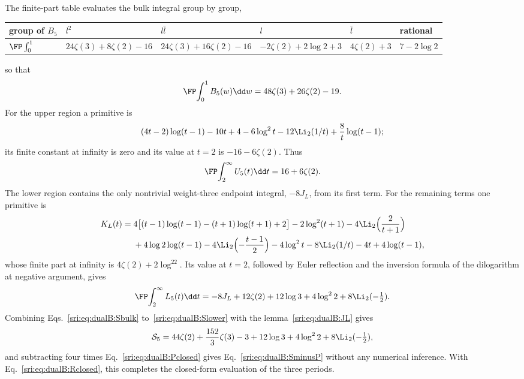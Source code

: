 The finite-part table evaluates the bulk integral group by group,
\begin{center}\small
\begin{tabular}{@{}llllll@{}}
\toprule
group of $B_5$ & $l^2$ & $l\bar l$ & $l$ & $\bar l$ & rational\\
\midrule
$\FP\int_0^1$ & $24\zeta(3)+8\zeta(2)-16$ & $24\zeta(3)+16\zeta(2)-16$ & $-2\zeta(2)+2\log2+3$ & $4\zeta(2)+3$
 & $7-2\log2$\\
\bottomrule
\end{tabular}
\end{center}
so that
\begin{equation}
 \FP\!\int_0^1B_5(w)\dd w=48\zeta(3)+26\zeta(2)-19.
 \label{sri:eq:dualB:Sbulk}
\end{equation}
For the upper region a primitive is
\begin{equation}
 (4t-2)\log(t-1)-10t+4-6\log^2t-12\Li_2(1/t)+\frac8t\log(t-1);
\end{equation}
its finite constant at infinity is zero and its value at $t=2$ is $-16-6\zeta(2)$. Thus
\begin{equation}
 \FP\!\int_2^\infty U_5(t)\dd t=16+6\zeta(2).
 \label{sri:eq:dualB:Supper}
\end{equation}
The lower region contains the only nontrivial weight-three endpoint integral, $-8J_L$, from its first term. For the
remaining terms one primitive is
\begin{equation}
\begin{aligned}
 K_L(t)={}&4\bigl[(t-1)\log(t-1)-(t+1)\log(t+1)+2\bigr]-2\log^2(t+1)-4\Li_2\Bigl(\frac2{t+1}\Bigr)\\
 &+4\log2\log(t-1)-4\Li_2\Bigl(-\frac{t-1}{2}\Bigr)-4\log^2t-8\Li_2(1/t)-4t+4\log(t-1),
\end{aligned}
\end{equation}
whose finite part at infinity is $4\zeta(2)+2\log^22$. Its value at $t=2$, followed by Euler reflection and the
inversion formula of the dilogarithm at negative argument, gives
\begin{equation}
 \FP\!\int_2^\infty L_5(t)\dd t=-8J_L+12\zeta(2)+12\log3+4\log^22+8\Li_2(-\tfrac12).
 \label{sri:eq:dualB:Slower}
\end{equation}
Combining Eqs.~\eqref{sri:eq:dualB:Sbulk} to~\eqref{sri:eq:dualB:Slower} with the lemma~\eqref{sri:eq:dualB:JL} gives
\begin{equation}
 \mathcal S_5=44\zeta(2)+\frac{152}{3}\zeta(3)-3+12\log3+4\log^22+8\Li_2(-\tfrac12),
 \label{sri:eq:dualB:Sclosed}
\end{equation}
and subtracting four times Eq.~\eqref{sri:eq:dualB:Pclosed} gives Eq.~\eqref{sri:eq:dualB:SminusP} without any numerical
inference. With Eq.~\eqref{sri:eq:dualB:Rclosed}, this completes the closed-form evaluation of the three periods.

